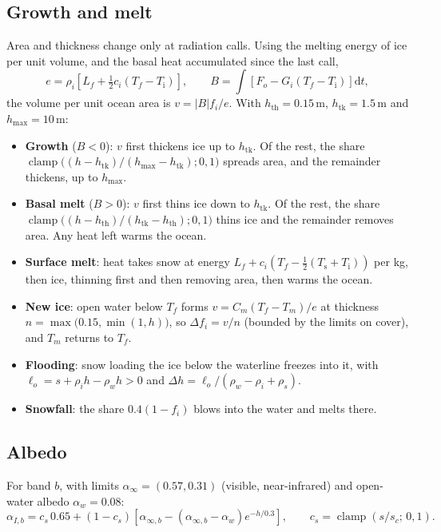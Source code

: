 \documentclass[11pt,a4paper]{article}
\newcommand{\dd}{\mathrm{d}}
\newcommand{\clamp}{\operatorname{clamp}}
\begin{document}
\subsection{Growth and melt}
Area and thickness change only at radiation calls. Using the melting energy of ice
per unit volume, and the basal heat accumulated since the last call,
\begin{equation}
e = \rho_i\left[L_f + \tfrac12c_i(T_f - T_{\mathrm{i}})\right], \qquad
B = \int\left[F_o - G_i(T_f - T_{\mathrm{i}})\right]\dd t,
\end{equation}
the volume per unit ocean area is $v = |B|f_i/e$. With $h_{\mathrm{th}} = 0.15$\,m,
$h_{\mathrm{tk}} = 1.5$\,m and $h_{\max} = 10$\,m:
\begin{itemize}
\item \textbf{Growth} ($B<0$): $v$ first thickens ice up to $h_{\mathrm{tk}}$. Of the
  rest, the share $\clamp\bigl((h-h_{\mathrm{tk}})/(h_{\max}-h_{\mathrm{tk}}); 0,1\bigr)$
  spreads area, and the remainder thickens, up to $h_{\max}$.
\item \textbf{Basal melt} ($B>0$): $v$ first thins ice down to $h_{\mathrm{tk}}$. Of the
  rest, the share $\clamp\bigl((h-h_{\mathrm{th}})/(h_{\mathrm{tk}}-h_{\mathrm{th}}); 0,1\bigr)$
  thins ice and the remainder removes area. Any heat left warms the ocean.
\item \textbf{Surface melt}: heat takes snow at energy
  $L_f + c_i(T_f - \tfrac12(T_{\mathrm{s}}+T_{\mathrm{i}}))$ per kg, then ice, thinning
  first and then removing area, then warms the ocean.
\item \textbf{New ice}: open water below $T_f$ forms $v = C_m(T_f - T_m)/e$ at
  thickness $n = \max\bigl(0.15, \min(1, h)\bigr)$, so $\Delta f_i = v/n$ (bounded
  by the limits on cover), and $T_m$ returns to $T_f$.
\item \textbf{Flooding}: snow loading the ice below the waterline freezes into it,
  with $\ell_o = s + \rho_ih - \rho_wh > 0$ and
  $\Delta h = \ell_o/(\rho_w - \rho_i + \rho_s)$.
\item \textbf{Snowfall}: the share $0.4(1-f_i)$ blows into the water and melts there.
\end{itemize}

\subsection{Albedo}
For band $b$, with limits $\alpha_{\infty} = (0.57, 0.31)$ (visible, near-infrared)
and open-water albedo $\alpha_w = 0.08$:
\begin{equation}
\alpha_{I,b} = c_s\,0.65 + (1-c_s)\left[\alpha_{\infty,b}
   - (\alpha_{\infty,b} - \alpha_w)e^{-h/0.3}\right], \qquad
c_s = \clamp(s/s_c;\,0,1).
\end{equation}
\end{document}
